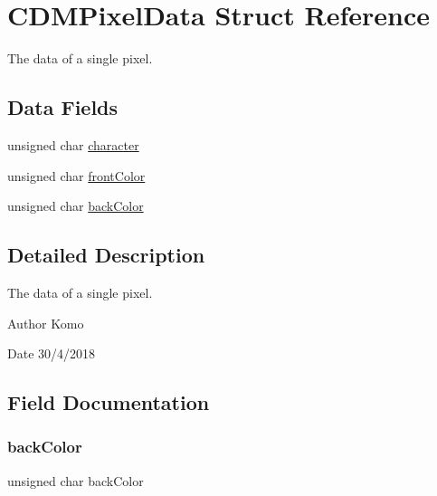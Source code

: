 \hypertarget{struct_c_d_m_pixel_data}{}\section{C\+D\+M\+Pixel\+Data Struct Reference}
\label{struct_c_d_m_pixel_data}


The data of a single pixel.  


\subsection*{Data Fields}
\begin{DoxyCompactItemize}
\item 
unsigned char \mbox{\hyperlink{struct_c_d_m_pixel_data_abe31bdd62e498dce604b14e75df142dd}{character}}
\item 
unsigned char \mbox{\hyperlink{struct_c_d_m_pixel_data_afb6f4c281a6ee8c9f689ee0980ae756d}{front\+Color}}
\item 
unsigned char \mbox{\hyperlink{struct_c_d_m_pixel_data_ad85b1951998b87079fe7ef92ac323ce5}{back\+Color}}
\end{DoxyCompactItemize}


\subsection{Detailed Description}
The data of a single pixel. 

\begin{DoxyAuthor}{Author}
Komo 
\end{DoxyAuthor}
\begin{DoxyDate}{Date}
30/4/2018 
\end{DoxyDate}


\subsection{Field Documentation}
\mbox{\label{struct_c_d_m_pixel_data_ad85b1951998b87079fe7ef92ac323ce5}} 
\subsubsection{\texorpdfstring{back\+Color}{backColor}}
{\footnotesize\ttfamily unsigned char back\+Color}

